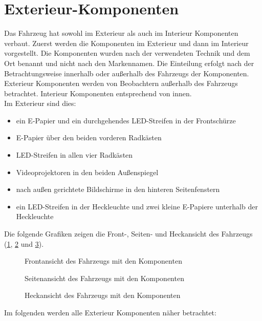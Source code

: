 \section{Exterieur-Komponenten}
Das Fahrzeug hat sowohl im Exterieur als auch im Interieur Komponenten verbaut. Zuerst werden die Komponenten im Exterieur und dann im Interieur vorgestellt. Die Komponenten wurden nach der verwendeten Technik und dem Ort benannt und nicht nach den Markennamen. Die Einteilung erfolgt nach der Betrachtungsweise innerhalb oder außerhalb des Fahrzeugs der Komponenten. Exterieur Komponenten werden von Beobachtern außerhalb des Fahrzeugs betrachtet. Interieur Komponenten entsprechend von innen.\\
Im Exterieur sind dies:
\begin{itemize}
	\item ein E-Papier und ein durchgehendes LED-Streifen in der Frontschürze
	\item E-Papier über den beiden vorderen Radkästen
	\item LED-Streifen in allen vier Radkästen
	\item Videoprojektoren in den beiden Außenspiegel
	\item nach außen gerichtete Bildschirme in den hinteren Seitenfenstern
	\item ein LED-Streifen in der Heckleuchte und zwei kleine E-Papiere unterhalb der Heckleuchte
\end{itemize}
Die folgende Grafiken zeigen die Front-, Seiten- und Heckansicht des Fahrzeugs (\ref{fig:frontansicht}, \ref{fig:seitansicht} und \ref{fig:heckansicht}).
\begin{figure}[hbt]
	\centering
	
	\caption[Frontansicht des Fahrzeugs mit den Komponenten]{Frontansicht des Fahrzeugs mit den Komponenten}
	\label{fig:frontansicht}
\end{figure}
\begin{figure}[hbt]
	\centering
	
	\caption[Seitenansicht des Fahrzeugs mit den Komponenten]{Seitenansicht des Fahrzeugs mit den Komponenten}
	\label{fig:seitansicht}
\end{figure}
\begin{figure}[hbt]
	\centering
	
	\caption[Heckansicht des Fahrzeugs mit den Komponenten]{Heckansicht des Fahrzeugs mit den Komponenten}
	\label{fig:heckansicht}
\end{figure}
Im folgenden werden alle Exterieur Komponenten näher betrachtet:
